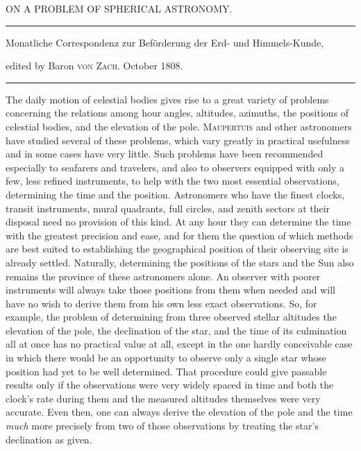 \clearpage{}%
\begin{center}
{\small ON A PROBLEM OF SPHERICAL ASTRONOMY.\par}
\medskip\hrule\medskip
{\small Monatliche Correspondenz zur Beförderung der Erd- und Himmels-Kunde,\par
edited by Baron \textsc{von Zach}. October 1808.\par}
\medskip\hrule
\end{center}\medskip
The daily motion of celestial bodies gives rise to a great variety of problems concerning the relations among hour angles, altitudes, azimuths, the positions of celestial bodies, and the elevation of the pole. \textsc{Maupertuis} and other astronomers have studied several of these problems, which vary greatly in practical usefulness and in some cases have very little. Such problems have been recommended especially to seafarers and travelers, and also to observers equipped with only a few, less refined instruments, to help with the two most essential observations, determining the time and the position. Astronomers who have the finest clocks, transit instruments, mural quadrants, full circles, and zenith sectors at their disposal need no provision of this kind. At any hour they can determine the time with the greatest precision and ease, and for them the question of which methods are best suited to establishing the geographical position of their observing site is already settled. Naturally, determining the positions of the stars and the Sun also remains the province of these astronomers alone. An observer with poorer instruments will always take those positions from them when needed and will have no wish to derive them from his own less exact observations. So, for example, the problem of determining from three observed stellar altitudes
%
the elevation of the pole, the declination of the star, and the time of its culmination all at once has no practical value at all, except in the one hardly conceivable case in which there would be an opportunity to observe only a single star whose position had yet to be well determined. That procedure could give passable results only if the observations were very widely spaced in time and both the clock’s rate during them and the measured altitudes themselves were very accurate. Even then, one can always derive the elevation of the pole and the time \textit{much} more precisely from two of those observations by treating the star’s declination as given.

